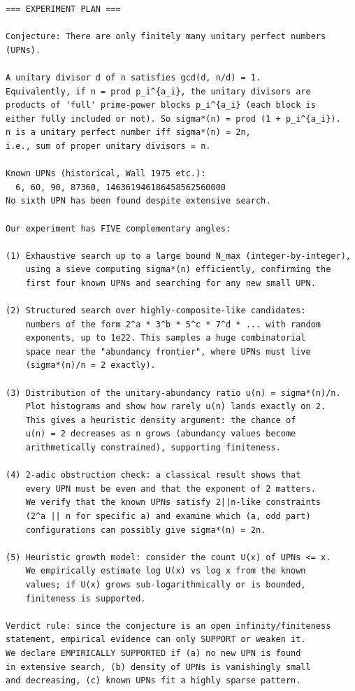 \documentclass[11pt]{article}
\begin{document}
\begin{lstlisting}
=== EXPERIMENT PLAN ===

Conjecture: There are only finitely many unitary perfect numbers (UPNs).

A unitary divisor d of n satisfies gcd(d, n/d) = 1.
Equivalently, if n = prod p_i^{a_i}, the unitary divisors are
products of 'full' prime-power blocks p_i^{a_i} (each block is
either fully included or not). So sigma*(n) = prod (1 + p_i^{a_i}).
n is a unitary perfect number iff sigma*(n) = 2n,
i.e., sum of proper unitary divisors = n.

Known UPNs (historical, Wall 1975 etc.):
  6, 60, 90, 87360, 146361946186458562560000
No sixth UPN has been found despite extensive search.

Our experiment has FIVE complementary angles:

(1) Exhaustive search up to a large bound N_max (integer-by-integer),
    using a sieve computing sigma*(n) efficiently, confirming the
    first four known UPNs and searching for any new small UPN.

(2) Structured search over highly-composite-like candidates:
    numbers of the form 2^a * 3^b * 5^c * 7^d * ... with random
    exponents, up to 1e22. This samples a huge combinatorial
    space near the "abundancy frontier", where UPNs must live
    (sigma*(n)/n = 2 exactly).

(3) Distribution of the unitary-abundancy ratio u(n) = sigma*(n)/n.
    Plot histograms and show how rarely u(n) lands exactly on 2.
    This gives a heuristic density argument: the chance of
    u(n) = 2 decreases as n grows (abundancy values become
    arithmetically constrained), supporting finiteness.

(4) 2-adic obstruction check: a classical result shows that
    every UPN must be even and that the exponent of 2 matters.
    We verify that the known UPNs satisfy 2||n-like constraints
    (2^a || n for specific a) and examine which (a, odd part)
    configurations can possibly give sigma*(n) = 2n.

(5) Heuristic growth model: consider the count U(x) of UPNs <= x.
    We empirically estimate log U(x) vs log x from the known
    values; if U(x) grows sub-logarithmically or is bounded,
    finiteness is supported.

Verdict rule: since the conjecture is an open infinity/finiteness
statement, empirical evidence can only SUPPORT or weaken it.
We declare EMPIRICALLY SUPPORTED if (a) no new UPN is found
in extensive search, (b) density of UPNs is vanishingly small
and decreasing, (c) known UPNs fit a highly sparse pattern.


\end{lstlisting}
\end{document}

